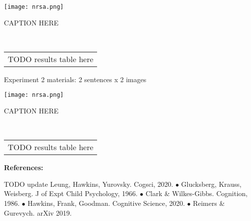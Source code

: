 \documentclass[11pt,a4paper]{article}
\begin{document}
\begin{minipage}{.5\textwidth}
	{	\texttt{[image: nrsa.png]}} 
	\begin{small}
	CAPTION HERE
		
	\end{small}
	
\end{minipage}
~~~
\begin{minipage}{.5\textwidth}	
	\begin{tabular}{l}
		TODO results table here\\
	\end{tabular}
\end{minipage}

\begin{minipage}{\textwidth}
	Experiment 2 materials: 2 sentences x 2 images
	
	
\end{minipage}
	
	
	\begin{minipage}{.5\textwidth}
		{	\texttt{[image: nrsa.png]}} 
		\begin{small}
			CAPTION HERE
			
		\end{small}
		
	\end{minipage}
	~~~
	\begin{minipage}{.5\textwidth}	
		\begin{tabular}{l}
			TODO results table here\\
		\end{tabular}
	\end{minipage}

\begin{minipage}{\textwidth}
	\begin{small} \textbf{References:}
		
		TODO update
Leung, Hawkins, Yurovsky. Cogsci, 2020. $\bullet$ Glucksberg, Krauss, Weisberg. J of Expt Child Psychology, 1966. $\bullet$ Clark \& Wilkes-Gibbs. Cognition, 1986. $\bullet$ Hawkins, Frank, Goodman. Cognitive Science, 2020. $\bullet$ Reimers \& Gurevych. arXiv 2019.
\end{small}
\end{minipage}
\end{document}
